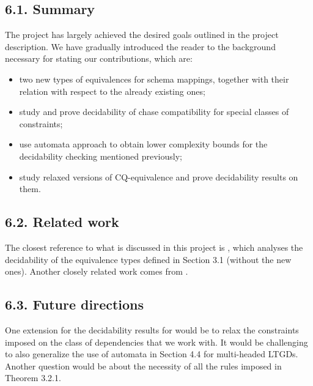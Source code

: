 \documentclass[11pt, a4paper, dvipsnames]{article}
\begin{document}
\subsection{6.1. Summary}
The project has largely achieved the desired goals outlined in the project description. We have gradually introduced the reader to the background necessary for stating our contributions, which are:
\begin{itemize}
	\item two new types of equivalences for schema mappings, together with their relation with respect to the already existing ones;
	\item study and prove decidability of chase compatibility for special classes of constraints;
	\item use automata approach to obtain lower complexity bounds for the decidability checking mentioned previously;
	\item study relaxed versions of CQ-equivalence and prove decidability results on them.
\end{itemize}
\subsection{6.2. Related work}
The closest reference to what is discussed in this project is \cite{equivalence}, which analyses the decidability of the equivalence types defined in Section 3.1 (without the new ones). Another closely related work comes from \cite{theory}.
\subsection{6.3. Future directions}
One extension for the decidability results for would be to relax the constraints imposed on the class of dependencies that we work with. It would be challenging to also generalize the use of automata in Section 4.4 for multi-headed LTGDs. Another question would be about the necessity of all the rules imposed in Theorem 3.2.1.

\newpage
\end{document}
